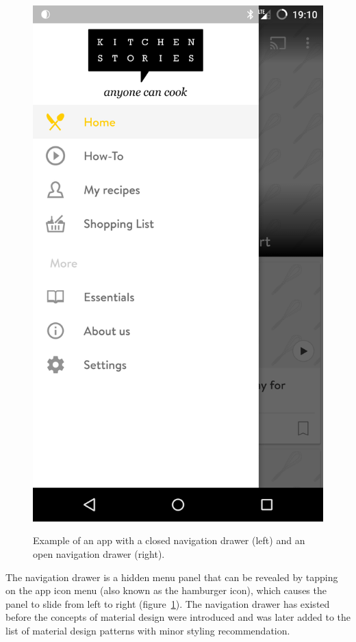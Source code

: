 \begin{figure}[H]
	{{\includegraphics[scale=0.1]{figures/findings/open-nav-drawer-kitchenstories.png} }}%
	\caption{Example of an app with a closed navigation drawer (left) and an open navigation drawer (right).}
	\label{fig:nav_drawer}
\end{figure}
The navigation drawer is a hidden menu panel that can be revealed by tapping on the app icon menu (also known as the hamburger icon), which causes the panel to slide from left to right (figure~\ref{fig:nav_drawer}).
The navigation drawer has existed before the concepts of material design were introduced and was later added to the list of material design patterns with minor styling recommendation.
